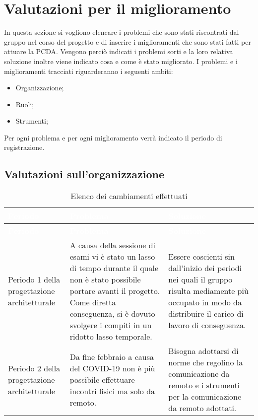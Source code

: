 \clearpage
\section{Valutazioni per il miglioramento}
In questa sezione si vogliono elencare i problemi che sono stati riscontrati dal gruppo nel corso del progetto e di inserire i miglioramenti che sono stati fatti per attuare la PCDA. Vengono perciò indicati i problemi sorti e la loro relativa soluzione inoltre viene indicato cosa e come è stato migliorato.
I problemi e i miglioramenti tracciati riguarderanno i seguenti ambiti:
\begin{itemize}
\item Organizzazione;
\item Ruoli;
\item Strumenti;
\end{itemize}
Per ogni problema e per ogni miglioramento verrà indicato il periodo di registrazione.

\subsection{Valutazioni sull'organizzazione}
{
	\renewcommand{\arraystretch}{1.5}
	\centering
	\begin{longtable}{ C{3cm} C{5.5cm} C{5.5cm}}
		\caption{Elenco dei cambiamenti effettuati}\\
		\textcolor{white}{\textbf{Periodo}} & \textcolor{white}{\textbf{Problema}} & \textcolor{white}{\textbf{Soluzione}}\\
		\endfirsthead
		\textcolor{white}{\textbf{Periodo}} & \textcolor{white}{\textbf{Problema}} & \textcolor{white}{\textbf{Soluzione}}\\
		\endhead
		Periodo 1 della progettazione architetturale & A causa della sessione di esami vi è stato un lasso di tempo durante il quale non è stato possibile portare avanti il progetto. Come diretta conseguenza, si è dovuto svolgere i compiti in un ridotto lasso temporale. & Essere coscienti sin dall'inizio dei periodi nei quali il gruppo risulta mediamente più occupato in modo da distribuire il carico di lavoro di conseguenza. \\
		
		Periodo 2 della progettazione architetturale & Da fine febbraio a causa del COVID-19 non è più possibile effettuare incontri fisici ma solo da remoto. & Bisogna adottarsi di norme che regolino la comunicazione da remoto e i strumenti per la comunicazione da remoto adottati. \\
		
	\end{longtable}
}


